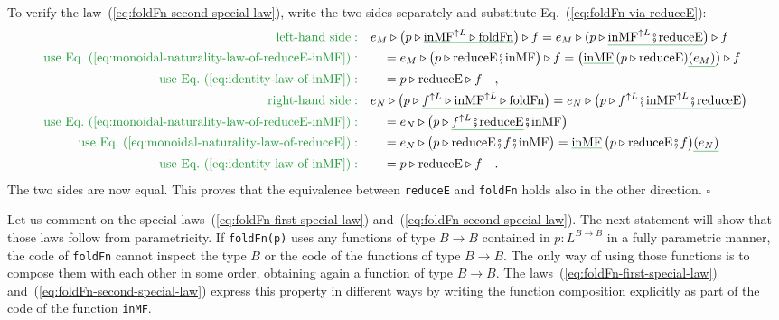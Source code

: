 To verify the law~(\ref{eq:foldFn-second-special-law}), write the
two sides separately and substitute Eq.~(\ref{eq:foldFn-via-reduceE}):
\begin{align*}
{\color{greenunder}\text{left-hand side}:}\quad & e_{M}\triangleright\big(p\triangleright\gunderline{\text{inMF}^{\uparrow L}\triangleright\text{foldFn}}\big)\triangleright f=e_{M}\triangleright(p\triangleright\gunderline{\text{inMF}^{\uparrow L}\bef\text{reduceE}}\big)\triangleright f\\
{\color{greenunder}\text{use Eq.~(\ref{eq:monoidal-naturality-law-of-reduceE-inMF})}:}\quad & \quad=e_{M}\triangleright\big(p\triangleright\text{reduceE}\bef\text{inMF}\big)\triangleright f=\big(\gunderline{\text{inMF}}\,(p\triangleright\text{reduceE})\gunderline{(e_{M})}\big)\triangleright f\\
{\color{greenunder}\text{use Eq.~(\ref{eq:identity-law-of-inMF})}:}\quad & \quad=p\triangleright\text{reduceE}\triangleright f\quad,\\
{\color{greenunder}\text{right-hand side}:}\quad & e_{N}\triangleright\big(p\triangleright\gunderline{f^{\uparrow L}\triangleright\text{inMF}^{\uparrow L}\triangleright\text{foldFn}}\big)=e_{N}\triangleright\big(p\triangleright f^{\uparrow L}\bef\gunderline{\text{inMF}^{\uparrow L}\bef\text{reduceE}}\big)\\
{\color{greenunder}\text{use Eq.~(\ref{eq:monoidal-naturality-law-of-reduceE-inMF})}:}\quad & \quad=e_{N}\triangleright\big(p\triangleright\gunderline{f^{\uparrow L}\bef\text{reduceE}}\bef\text{inMF}\big)\\
{\color{greenunder}\text{use Eq.~(\ref{eq:monoidal-naturality-law-of-reduceE})}:}\quad & \quad=e_{N}\triangleright\big(p\triangleright\text{reduceE}\bef f\bef\text{inMF}\big)=\gunderline{\text{inMF}}\,\big(p\triangleright\text{reduceE}\bef f\big)\gunderline{(e_{N})}\\
{\color{greenunder}\text{use Eq.~(\ref{eq:identity-law-of-inMF})}:}\quad & \quad=p\triangleright\text{reduceE}\triangleright f\quad.
\end{align*}
The two sides are now equal. This proves that the equivalence between
\lstinline!reduceE! and \lstinline!foldFn! holds also in the other
direction. $\square$

Let us comment on the special laws~(\ref{eq:foldFn-first-special-law})
and~(\ref{eq:foldFn-second-special-law}). The next statement will
show that those laws follow from parametricity. If \lstinline!foldFn(p)!
uses any functions of type $B\rightarrow B$ contained in $p:L^{B\rightarrow B}$
in a fully parametric manner, the code of \lstinline!foldFn! cannot
inspect the type $B$ or the code of the functions of type $B\rightarrow B$.
The only way of using those functions is to compose them with each
other in some order, obtaining again a function of type $B\rightarrow B$.
The laws~(\ref{eq:foldFn-first-special-law}) and~(\ref{eq:foldFn-second-special-law})
express this property in different ways by writing the function composition
explicitly as part of the code of the function \lstinline!inMF!.


